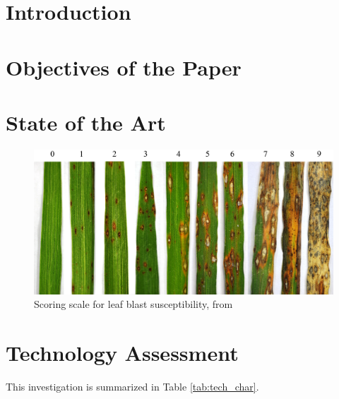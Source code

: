 \documentclass[5p]{elsarticle}  %
\begin{document}



\section{Introduction}
\label{sec:introduction}

\section{Objectives of the Paper} 
\label{sec:mission_objectives} 


\section{State of the Art}
\label{sec:market}


\begin{figure}[h]
  \centering
  \includegraphics[width=0.42 \textwidth]{figure/rice_blast.jpeg}
  \caption{Scoring scale for leaf blast susceptibility, from \cite{ethz16}}
  \label{fig:blast}
\end{figure}
  
\section{Technology Assessment}
  \label{Tech_part}

This investigation is summarized in Table \ref{tab:tech_char}.

\end{document}
